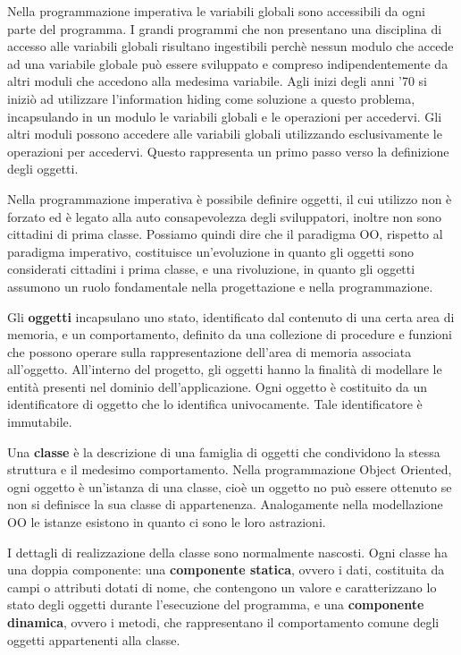 \documentclass[a4paper,18pt]{extarticle}
\begin{document}
Nella programmazione imperativa le variabili globali sono accessibili da ogni parte del programma. I grandi programmi che non presentano una disciplina di accesso alle variabili globali risultano ingestibili perchè nessun modulo che accede ad una variabile globale può essere sviluppato e compreso indipendentemente da altri moduli che accedono alla medesima variabile. Agli inizi degli anni '70 si iniziò ad utilizzare l'information hiding come soluzione a questo problema, incapsulando in un modulo le variabili globali e le operazioni per accedervi. Gli altri moduli possono accedere alle variabili globali utilizzando esclusivamente le operazioni per accedervi. Questo rappresenta un primo passo verso la definizione degli oggetti.

Nella programmazione imperativa è possibile definire oggetti, il cui utilizzo non è forzato ed è legato alla auto consapevolezza degli sviluppatori, inoltre non sono cittadini di prima classe. Possiamo quindi dire che il paradigma OO, rispetto al paradigma imperativo, costituisce un'evoluzione in quanto gli oggetti sono considerati cittadini i prima classe, e una rivoluzione, in quanto gli oggetti assumono un ruolo fondamentale nella progettazione e nella programmazione.

Gli \textbf{oggetti} incapsulano uno stato, identificato dal contenuto di una certa area di memoria, e un comportamento, definito da una collezione di procedure e funzioni che possono operare sulla rappresentazione dell'area di memoria associata all'oggetto. All'interno del progetto, gli oggetti hanno la finalità di modellare le entità presenti nel dominio dell'applicazione. Ogni oggetto è costituito da un identificatore di oggetto che lo identifica univocamente. Tale identificatore è immutabile.

Una \textbf{classe} è la descrizione di una famiglia di oggetti che condividono la stessa struttura e il medesimo comportamento. Nella programmazione Object Oriented, ogni oggetto è un'istanza di una classe, cioè un oggetto no può essere ottenuto se non si definisce la sua classe di appartenenza. Analogamente nella modellazione OO le istanze esistono in quanto ci sono le loro astrazioni.

I dettagli di realizzazione della classe sono normalmente nascosti. Ogni classe ha una doppia componente: una \textbf{componente statica}, ovvero i dati, costituita da campi o attributi dotati di nome, che contengono un valore e caratterizzano lo stato degli oggetti durante l'esecuzione del programma, e una \textbf{componente dinamica}, ovvero i metodi, che rappresentano il comportamento comune degli oggetti appartenenti alla classe.
\end{document}
